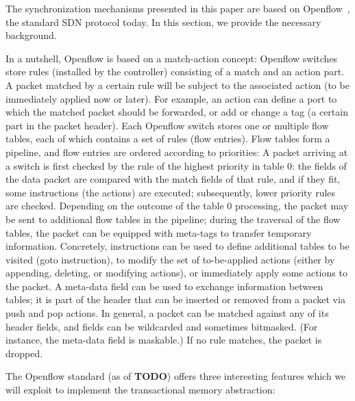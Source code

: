 \documentclass[conference]{sigcomm-alternate}
\begin{document}
The synchronization mechanisms presented in this paper
are based on Openflow~\cite{of-spec}, the standard SDN protocol today. In this section,
we provide the necessary background.

In a nutshell,
Openflow
is based on a match-action concept: Openflow switches store
rules (installed by the controller) consisting of a match and an
action part. A packet matched by a certain rule will be subject
to the associated action (to be immediately applied now or later).
For example, an action can define a port to which the
matched packet should be forwarded, or add or change a tag
(a certain part in the packet header).
Each Openflow switch stores one or multiple flow tables,
each of which contains a set of rules (flow entries). Flow
tables form a pipeline, and flow entries are ordered according
to priorities: A packet arriving at a switch is first checked by
the rule of the highest priority in table 0: the fields of the
data packet are compared with the match fields of that rule,
and if they fit, some instructions (the actions) are executed;
subsequently, lower priority rules are checked. Depending on
the outcome of the table 0 processing, the packet may be sent
to additional flow tables in the pipeline; during the traversal of
the flow tables, the packet can be equipped with meta-tags to
transfer temporary information. Concretely, instructions can be
used to define additional tables to be visited (goto instruction),
to modify the set of to-be-applied actions (either by appending,
deleting, or modifying actions), or immediately apply some
actions to the packet. A meta-data field can be used to exchange
information between tables; it is part of the header that can be
inserted or removed from a packet via push and pop actions.
In general, a packet can be matched against any of its header
fields, and fields can be wildcarded and sometimes bitmasked.
(For instance, the meta-data field is maskable.) If no rule
matches, the packet is dropped.

The Openflow standard (as of \textbf{TODO}) offers three interesting
features which we will exploit to implement the transactional memory abstraction:
\end{document}
